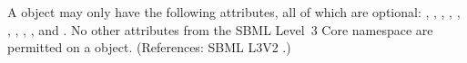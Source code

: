 A \Model object may only have the following attributes, all of which are
optional: , , , ,
, , ,
, ,  and
.  No other attributes from the SBML Level~3 Core
namespace are permitted on a \Model object.  (References: SBML L3V2
.)
